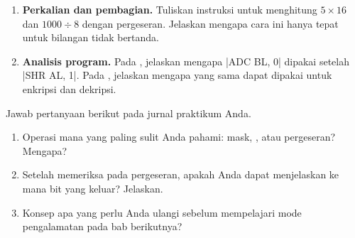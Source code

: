 \begin{enumerate}
    \item \textbf{Perkalian dan pembagian.} Tuliskan instruksi untuk
          menghitung $5 \times 16$ dan $1000 \div 8$ dengan
          pergeseran. Jelaskan mengapa cara ini hanya tepat untuk
          bilangan tidak bertanda.

    \item \textbf{Analisis program.} Pada ,
          jelaskan mengapa \lstasm|ADC BL, 0| dipakai setelah
          \lstasm|SHR AL, 1|. Pada , jelaskan
          mengapa  yang sama dapat dipakai untuk enkripsi
          dan dekripsi.
\end{enumerate}

\begin{refleksibox}
\vspace{1.1em}
Jawab pertanyaan berikut pada jurnal praktikum Anda.
\begin{enumerate}
    \item Operasi mana yang paling sulit Anda pahami: mask,
          , atau pergeseran? Mengapa?
    \item Setelah memeriksa  pada pergeseran, apakah Anda
          dapat menjelaskan ke mana bit yang keluar? Jelaskan.
    \item Konsep apa yang perlu Anda ulangi sebelum mempelajari
          mode pengalamatan pada bab berikutnya?
\end{enumerate}
\end{refleksibox}
